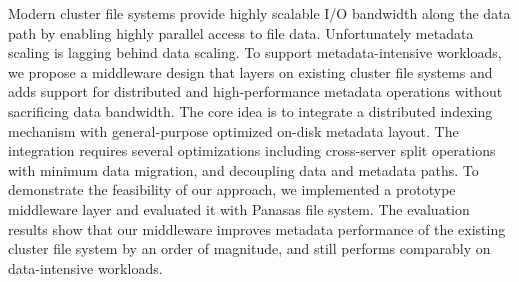 
Modern cluster file systems provide highly scalable I/O bandwidth along the
data path by enabling highly parallel access to file data.
Unfortunately metadata scaling is lagging behind data scaling.
To support metadata-intensive workloads,
we propose a middleware design that layers on existing cluster file systems
and adds support for distributed and high-performance metadata operations
without sacrificing data bandwidth.
The core idea is to integrate a distributed indexing mechanism
with general-purpose optimized on-disk metadata layout.
The integration requires several optimizations including cross-server split
operations with minimum data migration, and decoupling data and metadata paths.
To demonstrate the feasibility of our approach,
we implemented a prototype middleware layer and evaluated it with Panasas file system.
The evaluation results show that our middleware improves
metadata performance of the existing cluster file system by an order of magnitude,
and still performs comparably on data-intensive workloads.
